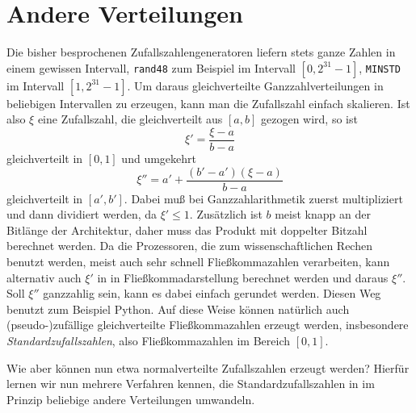 \section{Andere Verteilungen}

Die bisher besprochenen Zufallszahlengeneratoren liefern stets ganze
Zahlen in einem gewissen Intervall, \texttt{rand48} zum Beispiel
im Intervall $[0,2^{31}-1]$, \texttt{MINSTD} im Intervall
$[1,2^{31}-1]$. Um daraus gleichverteilte Ganzzahlverteilungen in
beliebigen Intervallen zu erzeugen, kann man die Zufallszahl einfach
skalieren. Ist also $\xi$ eine Zufallszahl, die gleichverteilt aus
$[a,b]$ gezogen wird, so ist
\begin{equation}
  \xi' = \frac{\xi - a}{b-a}
\end{equation}
gleichverteilt in $[0,1]$ und umgekehrt
\begin{equation}
  \xi'' = a' + \frac{(b'-a')(\xi - a)}{b-a}
\end{equation}
gleichverteilt in $[a',b']$. Dabei muß bei Ganzzahlarithmetik zuerst
multipliziert und dann dividiert werden, da $\xi' \le 1$. Zusätzlich
ist $b$ meist knapp an der Bitlänge der Architektur, daher muss das
Produkt mit doppelter Bitzahl berechnet werden. Da die Prozessoren,
die zum wissenschaftlichen Rechen benutzt werden, meist auch sehr
schnell Fließkommazahlen verarbeiten, kann alternativ auch $\xi'$ in
in Fließkommadarstellung berechnet werden und daraus $\xi''$. Soll
$\xi''$ ganzzahlig sein, kann es dabei einfach gerundet werden. Diesen
Weg benutzt zum Beispiel Python. Auf diese Weise können natürlich auch
(pseudo-)zufällige gleichverteilte Fließkommazahlen erzeugt werden,
insbesondere \emph{Standardzufallszahlen},
also Fließkommazahlen im Bereich $[0,1]$.

Wie aber können nun etwa normalverteilte Zufallszahlen erzeugt werden?
Hierfür lernen wir nun mehrere Verfahren kennen, die
Standardzufallszahlen in im Prinzip beliebige andere Verteilungen
umwandeln.

\subsection{}

